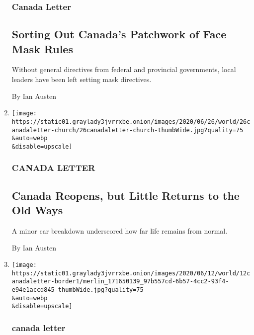 \begin{enumerate}
{  \subsubsection{Canada Letter}\label{canada-letter-3}}

  \hypertarget{sorting-out-canadas-patchwork-of-face-mask-rules}{%
  \subsection{Sorting Out Canada's Patchwork of Face Mask
  Rules}\label{sorting-out-canadas-patchwork-of-face-mask-rules}}

  Without general directives from federal and provincial governments,
  local leaders have been left setting mask directives.

  By Ian Austen
\item
  \href{/2020/06/26/world/canada/canada-reopens-but-little-returns-to-the-old-ways.html}{}

  \texttt{[image: https://static01.graylady3jvrrxbe.onion/images/2020/06/26/world/26canadaletter-church/26canadaletter-church-thumbWide.jpg?quality=75\\\&auto=webp\\\&disable=upscale]}

  \hypertarget{canada-letter-4}{%
  \subsubsection{CANADA LETTER}\label{canada-letter-4}}

  \hypertarget{canada-reopens-but-little-returns-to-the-old-ways}{%
  \subsection{Canada Reopens, but Little Returns to the Old
  Ways}\label{canada-reopens-but-little-returns-to-the-old-ways}}

  A minor car breakdown underscored how far life remains from normal.

  By Ian Austen
\item
  \href{/2020/06/12/world/canada/us-canadian-border.html}{}

  \texttt{[image: https://static01.graylady3jvrrxbe.onion/images/2020/06/12/world/12canadaletter-border1/merlin\_171650139\_97b557cd-6b57-4cc2-93f4-e94e1accd845-thumbWide.jpg?quality=75\\\&auto=webp\\\&disable=upscale]}

  \hypertarget{canada-letter-5}{%
  \subsubsection{canada letter}\label{canada-letter-5}}


\end{enumerate}
